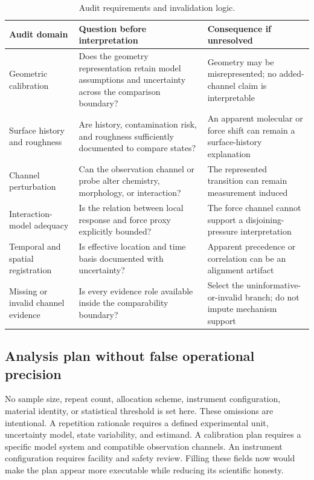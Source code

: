 \documentclass[conference]{IEEEtran}
\begin{document}
\begin{table}[!t]
\caption{Audit requirements and invalidation logic.}
\label{tab:audit}
\centering
\footnotesize
\begin{tabular}{L{0.22\textwidth}L{0.30\textwidth}L{0.34\textwidth}}
\toprule
Audit domain & Question before interpretation & Consequence if unresolved \\
\midrule
Geometric calibration & Does the geometry representation retain model assumptions and uncertainty across the comparison boundary? & Geometry may be misrepresented; no added-channel claim is interpretable \\
Surface history and roughness & Are history, contamination risk, and roughness sufficiently documented to compare states? & An apparent molecular or force shift can remain a surface-history explanation \\
Channel perturbation & Can the observation channel or probe alter chemistry, morphology, or interaction? & The represented transition can remain measurement induced \\
Interaction-model adequacy & Is the relation between local response and force proxy explicitly bounded? & The force channel cannot support a disjoining-pressure interpretation \\
Temporal and spatial registration & Is effective location and time basis documented with uncertainty? & Apparent precedence or correlation can be an alignment artifact \\
Missing or invalid channel evidence & Is every evidence role available inside the comparability boundary? & Select the uninformative-or-invalid branch; do not impute mechanism support \\
\bottomrule
\end{tabular}
\end{table}

\subsection{Analysis plan without false operational precision}

No sample size, repeat count, allocation scheme, instrument configuration, material identity, or statistical threshold is set here. These omissions are intentional. A repetition rationale requires a defined experimental unit, uncertainty model, state variability, and estimand. A calibration plan requires a specific model system and compatible observation channels. An instrument configuration requires facility and safety review. Filling these fields now would make the plan appear more executable while reducing its scientific honesty.
\end{document}
